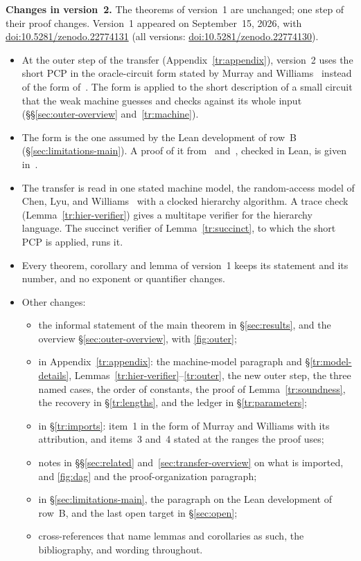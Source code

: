 \documentclass[11pt,letterpaper]{article}
\theoremstyle{definition}
\theoremstyle{remark}
\begin{document}
\setcounter{page}{1}
\hypersetup{pageanchor=true}

\noindent\textbf{Changes in version~2.} The theorems of version~1
are unchanged; one step of their proof changes. Version~1 appeared on
September~15, 2026, with
\href{https://doi.org/10.5281/zenodo.22774131}{doi:10.5281/zenodo.22774131}
(all versions:
\href{https://doi.org/10.5281/zenodo.22774130}{doi:10.5281/zenodo.22774130}).
\begin{itemize}
\item At the outer step of the transfer (Appendix~\ref{tr:appendix}),
version~2 uses the short PCP in the oracle-circuit form stated by Murray
and Williams~\cite[Section~5]{MW20} instead of the form
of~\cite[Lemma~3.10]{CLW}. The form is applied to the short description
of a small circuit that the weak machine guesses and checks against its
whole input (\S\S\ref{sec:outer-overview} and~\ref{tr:machine}).
\item The form is the one assumed by the Lean development of row~B
(\S\ref{sec:limitations-main}). A proof of it
from~\cite[Theorem~11.1]{BCGT13} and~\cite[Corollary~3.2]{Sho88},
checked in Lean, is given in~\cite{NagQuartic}.
\item The transfer is read in one stated machine model, the
random-access model of Chen, Lyu, and Williams~\cite[Section~4.1]{CLW}
with a clocked hierarchy algorithm. A trace check
(Lemma~\ref{tr:hier-verifier}) gives a multitape verifier for the
hierarchy language. The succinct verifier of Lemma~\ref{tr:succinct},
to which the short PCP is applied, runs it.

\item Every theorem, corollary and lemma of version~1 keeps its
statement and its number, and no exponent or quantifier changes.

\item Other changes:
\begin{itemize}
\item the informal statement of the main theorem in
\S\ref{sec:results}, and the overview \S\ref{sec:outer-overview}, with
\cref{fig:outer};
\item in Appendix~\ref{tr:appendix}: the machine-model paragraph and
\S\ref{tr:model-details}, Lemmas~\ref{tr:hier-verifier}--\ref{tr:outer},
the new outer step, the three named cases, the order of constants, the
proof of Lemma~\ref{tr:soundness}, the recovery in \S\ref{tr:lengths},
and the ledger in \S\ref{tr:parameters};
\item in \S\ref{tr:imports}: item~1 in the form of Murray and Williams
with its attribution, and items~3 and~4 stated at the ranges the proof
uses;
\item notes in \S\S\ref{sec:related} and~\ref{sec:transfer-overview} on
what is imported, and \cref{fig:dag} and the proof-organization
paragraph;
\item in \S\ref{sec:limitations-main}, the paragraph on the Lean
development of row~B, and the last open target in \S\ref{sec:open};
\item cross-references that name lemmas and corollaries as such, the
bibliography, and wording throughout.
\end{itemize}
\end{itemize}
\end{document}
